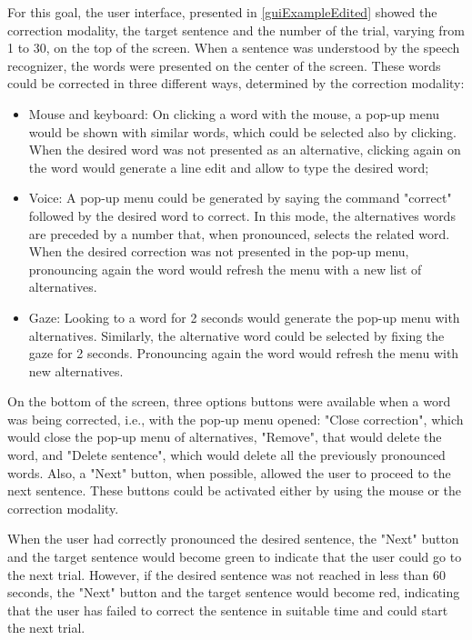 \documentclass[]{article}
\begin{document}
For this goal, the user interface, presented in \ref{guiExampleEdited} showed the correction modality, the target sentence and the number of the trial, varying from 1 to 30, on the top of the screen. When a sentence was understood by the speech recognizer, the words were presented on the center of the screen. These words could be corrected in three different ways, determined by the correction modality:
\begin{itemize}
  \item Mouse and keyboard: On clicking a word with the mouse, a pop-up menu would be shown with similar words, which could be selected also by clicking. When the desired word was not presented as an alternative, clicking again on the word would generate a line edit and allow to type the desired word;
  \item Voice: A pop-up menu could be generated by saying the command "correct" followed by the desired word to correct. In this mode, the alternatives words are preceded by a number that, when pronounced, selects the related word. When the desired correction was not presented in the pop-up menu, pronouncing again the word would refresh the menu with a new list of alternatives.
  \item Gaze: Looking to a word for 2 seconds would generate the pop-up menu with alternatives. Similarly, the alternative word could be selected by fixing the gaze for 2 seconds. Pronouncing again the word would refresh the menu with new alternatives.
\end{itemize}

On the bottom of the screen, three options buttons were available when a word was being corrected, i.e., with the pop-up menu opened: "Close correction", which would close the pop-up menu of alternatives, "Remove", that would delete the word, and "Delete sentence", which would delete all the previously pronounced words. Also, a "Next" button, when possible, allowed the user to proceed to the next sentence. These buttons could be activated either by using the mouse or the correction modality.

When the user had correctly pronounced the desired sentence, the "Next" button and the target sentence would become green to indicate that the user could go to the next trial. However, if the desired sentence was not reached in less than 60 seconds, the "Next" button and the target sentence would become red, indicating that the user has failed to correct the sentence in suitable time and could start the next trial.
\end{document}
